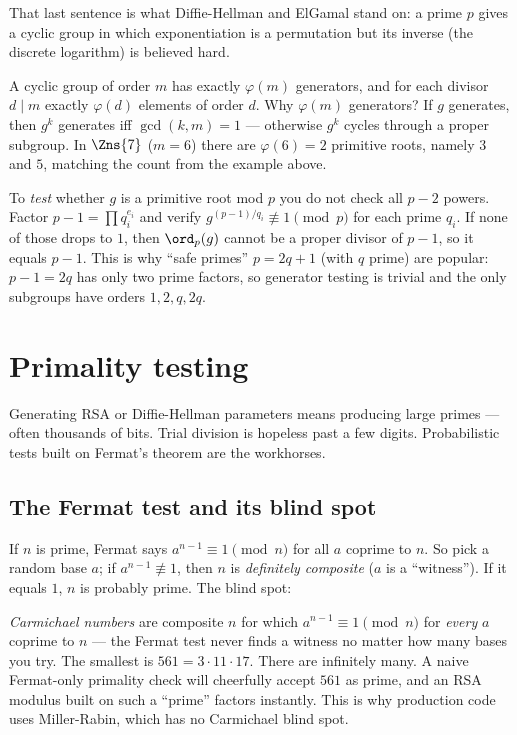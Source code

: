 That last sentence is what Diffie-Hellman and ElGamal stand on: a prime $p$ gives a cyclic group in
which exponentiation is a permutation but its inverse (the discrete logarithm) is believed hard.

\begin{whybox}
A cyclic group of order $m$ has exactly $\varphi(m)$ generators, and for each divisor $d\mid m$
exactly $\varphi(d)$ elements of order $d$. Why $\varphi(m)$ generators? If $g$ generates, then
$g^k$ generates iff $\gcd(k,m)=1$ --- otherwise $g^k$ cycles through a proper subgroup. In $\Zns{7}$
($m=6$) there are $\varphi(6)=2$ primitive roots, namely $3$ and $5$, matching the count from the
example above.
\end{whybox}

\begin{connectionbox}
To \emph{test} whether $g$ is a primitive root mod $p$ you do not check all $p-2$ powers. Factor
$p-1 = \prod q_i^{e_i}$ and verify $g^{(p-1)/q_i}\not\equiv 1\pmod p$ for each prime $q_i$. If none of
those drops to $1$, then $\ord_p(g)$ cannot be a proper divisor of $p-1$, so it equals $p-1$. This is
why ``safe primes'' $p = 2q+1$ (with $q$ prime) are popular: $p-1 = 2q$ has only two prime factors,
so generator testing is trivial and the only subgroups have orders $1,2,q,2q$.
\end{connectionbox}

\section{Primality testing}
\label{ch40:primality}

Generating RSA or Diffie-Hellman parameters means producing large primes --- often thousands of
bits. Trial division is hopeless past a few digits. Probabilistic tests built on Fermat's theorem
are the workhorses.

\subsection{The Fermat test and its blind spot}
\label{ch40:fermat-test}

If $n$ is prime, Fermat says $a^{n-1}\equiv 1\pmod n$ for all $a$ coprime to $n$. So pick a random
base $a$; if $a^{n-1}\not\equiv 1$, then $n$ is \emph{definitely composite} ($a$ is a ``witness'').
If it equals $1$, $n$ is probably prime. The blind spot:

\begin{attackbox}
\emph{Carmichael numbers} are composite $n$ for which $a^{n-1}\equiv 1\pmod n$ for \emph{every} $a$
coprime to $n$ --- the Fermat test never finds a witness no matter how many bases you try. The
smallest is $561 = 3\cdot 11\cdot 17$. There are infinitely many. A naive Fermat-only primality
check will cheerfully accept $561$ as prime, and an RSA modulus built on such a ``prime'' factors
instantly. This is why production code uses Miller-Rabin, which has no Carmichael blind spot.
\end{attackbox}

